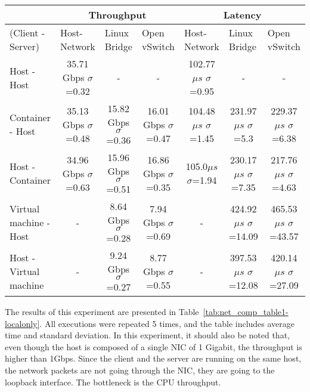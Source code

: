 \documentclass[conference]{IEEEtran}
\begin{document}
\begin{table*}[!t]
\renewcommand{\arraystretch}{1.3}
\centering
\caption{Network throughput and latency evaluation for different
    configurations of client/server under bare-metal, container
and virtual machine on a single host machine}
\begin{tabular}{|l|c|c|c||c|c|c|}
\hline
& \multicolumn{3}{c||}{Throughput} & \multicolumn{3}{c|}{Latency}                                                                \\
\hline
(Client - Server) & \multicolumn{1}{l|}{Host-Network} & \multicolumn{1}{l|}{Linux Bridge } & \multicolumn{1}{l||}{Open vSwitch} & \multicolumn{1}{l|}{Host-Network} & \multicolumn{1}{l|}{Linux Bridge } & \multicolumn{1}{l|}{Open vSwitch}  \\
\hline
\hline
Host - Host            & 35.71 Gbps $\sigma$=0.32 & -                        & -                        & 102.77 $\mu s$	$\sigma$=0.95 & -                               & -                               \\ \hline
Container - Host       & 35.13 Gbps $\sigma$=0.48 & 15.82 Gbps $\sigma$=0.36 & 16.01 Gbps $\sigma$=0.47 & 104.48$\mu s$ $\sigma$=1.45 & 231.97$\mu s$ $\sigma$=5.3   & 229.37$\mu s$	$\sigma$=6.38 \\ \hline
Host - Container       & 34.96 Gbps $\sigma$=0.63 & 15.96 Gbps $\sigma$=0.51 & 16.86 Gbps $\sigma$=0.35 & 105.0$\mu s$	$\sigma$=1.94  & 230.17$\mu s$ $\sigma$=7.35  & 217.76$\mu s$	$\sigma$=4.63 \\ \hline
Virtual machine - Host & - 						  & 8.64 Gbps $\sigma$=0.28  & 7.94 Gbps $\sigma$=0.69         & - 	                       & 424.92$\mu s$ $\sigma$=14.09 & 465.53$\mu s$ $\sigma$=43.57             \\ \hline
Host - Virtual machine & - 						  & 9.24 Gbps $\sigma$=0.27  & 8.77 Gbps $\sigma$=0.55         & - 	                       & 397.53$\mu s$ $\sigma$=12.08 & 420.14$\mu s$ $\sigma$=27.09            \\ \hline
\end{tabular}
\label{tab:net_comp_table1-localonly}
\end{table*}

The results of this experiment are presented in
Table~\ref{tab:net_comp_table1-localonly}. All executions were repeated
5 times, and the table includes average time and standard deviation. In this
experiment, it should also be noted that, even though the host is composed of a
single NIC of 1 Gigabit, the throughput is higher than 1Gbps. 
Since the client and the server are running on the same host, the 
network packets are not going through the NIC, they are going to 
the loopback interface. The bottleneck is the CPU throughput.
\end{document}
